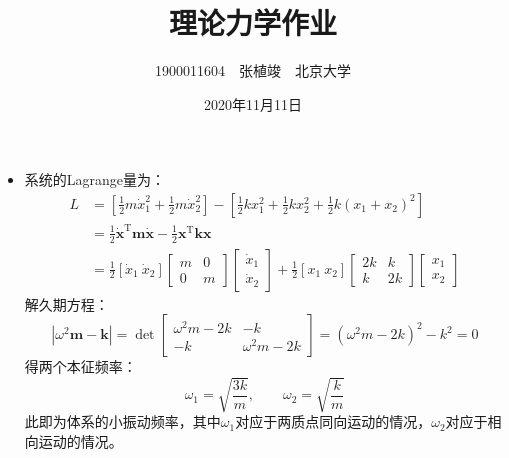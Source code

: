 \documentclass[a4paper,fontset=windows]{ctexart}
\begin{document}
    \title{\textbf{理论力学作业}}
    \author{1900011604\ \ 张植竣\ \ 北京大学}
    \date{2020年11月11日}

    \maketitle

    \begin{itemize}

        \section*{第四章}

        \item[3.1.(1)]
        系统的Lagrange量为：
        \begin{align*}
        L
        &= \left[\frac{1}{2}m\dot{x}_1^2 + \frac{1}{2}m\dot{x}_2^2\right] - \left[\frac{1}{2}kx_1^2 + \frac{1}{2}kx_2^2 + \frac{1}{2}k(x_1+x_2)^2\right] \\
        &= \frac{1}{2}\boldsymbol{\dot{x}}^{\mathrm{T}}\boldsymbol{m}\boldsymbol{\dot{x}} - \frac{1}{2}\boldsymbol{x}^{\mathrm{T}}\boldsymbol{k}\boldsymbol{x} \\
        &= \frac{1}{2}
        [\dot{x}_1\ \dot{x}_2]
        \begin{bmatrix}
            m & 0 \\
            0 & m
        \end{bmatrix}
        \begin{bmatrix}
            \dot{x}_1 \\
            \dot{x}_2
        \end{bmatrix}
        + \frac{1}{2}
        [x_1\ x_2]
        \begin{bmatrix}
            2k & k \\
            k & 2k
        \end{bmatrix}
        \begin{bmatrix}
            x_1 \\
            x_2
        \end{bmatrix}
        \end{align*}
        解久期方程：
        \[
        \left|\omega^2\boldsymbol{m}- \boldsymbol{k}\right|
        = \det
        \begin{bmatrix}
            \omega^{2}m-2k & -k \\
            -k & \omega^{2}m-2k
        \end{bmatrix}
        = (\omega^{2}m-2k)^2 - k^2
        = 0
        \]
        得两个本征频率：
        \[
        \omega_1 = \sqrt{\frac{3k}{m}},\qquad \omega_2 = \sqrt{\frac{k}{m}}
        \]
        此即为体系的小振动频率，其中$\omega_1$对应于两质点同向运动的情况，$\omega_2$对应于相向运动的情况。
        \medskip


\end{itemize}
\end{document}
